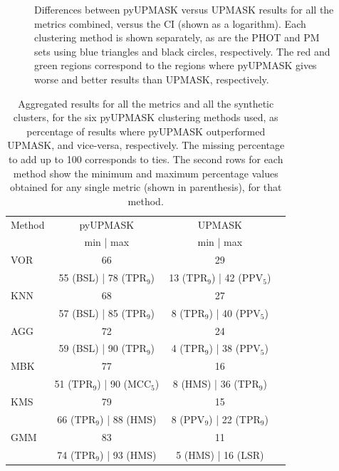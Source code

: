 \documentclass{aa}
\begin{document}
 \begin{figure}
 \caption{Differences between pyUPMASK versus UPMASK results for all the
 metrics combined, versus the CI (shown as a logarithm). Each clustering method
 is shown separately, as are the PHOT and PM sets using blue triangles and
 black circles, respectively. The red and green regions correspond to the
 regions where pyUPMASK gives worse and better results than UPMASK,
 respectively.}
 \label{fig:CIdelta}
 \end{figure}

 \begin{table}
 \caption{Aggregated results for all the metrics and all the synthetic
 clusters, for the six pyUPMASK clustering methods used, as percentage of
 results where pyUPMASK outperformed UPMASK, and vice-versa, respectively. The
 missing percentage to add up to 100 corresponds to ties.
 The second rows for each method show the minimum and maximum percentage values
 obtained for any single metric (shown in parenthesis), for that method.}
 \label{tab:results}
 \centering
 \begin{tabular}{l c c l}
 \hline\hline
 Method & pyUPMASK & UPMASK\\
  & min | max & min | max \\
 \hline
   VOR & 66 & 29 \\
   & 55 (BSL) | 78 (TPR$_9$) & 13 (TPR$_9$) | 42 (PPV$_5$)\\
   KNN & 68 & 27\\
   & 57 (BSL) | 85 (TPR$_9$) & 8 (TPR$_9$) | 40 (PPV$_5$)\\
   AGG & 72 & 24 \\
   & 59 (BSL) | 90 (TPR$_9$) & 4 (TPR$_9$) | 38 (PPV$_5$)\\
   MBK & 77 & 16\\
   & 51 (TPR$_9$) | 90 (MCC$_5$) & 8 (HMS) | 36 (TPR$_9$)\\
   KMS & 79 & 15\\
   & 66 (TPR$_9$) | 88 (HMS) & 8 (PPV$_9$) | 22 (TPR$_9$)\\
   GMM & 83 & 11\\
   & 74 (TPR$_9$) | 93 (HMS) & 5 (HMS) | 16 (LSR)\\
 \hline
 \end{tabular}
 \end{table}
\end{document}
